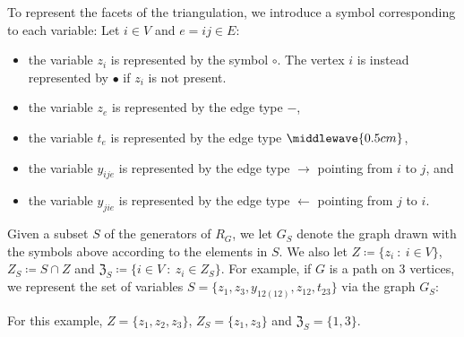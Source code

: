 To represent the facets of the triangulation, we introduce a symbol corresponding to each variable: Let $i\in V$ and $e=ij\in E$:
\begin{itemize}
    \item the variable $z_i$ is represented by the symbol $\circ$.  The vertex $i$ is instead represented by $\bullet$ if $z_i$ is not present. 
    \item the variable $z_{e}$ is represented by the edge type $-$,
    \item the variable $t_{e}$ is represented by the edge type $\middlewave{0.5cm}$,
    \item the variable $y_{ije}$ is represented by the edge type $\rightarrow$ pointing from $i$ to $j$, and 
    \item the variable $y_{jie}$ is represented by the edge type $\leftarrow$ pointing from $j$ to $i$. 
\end{itemize}
Given a subset $S$ of the generators of $R_{G}$, we let $G_S$ denote the graph drawn with the symbols above according to the elements in $S$.  
We also let $Z \coloneqq \{z_i~ :~ i\in V\}$, $Z_S \coloneqq S\cap Z$ and $\mathfrak{Z}_S \coloneqq \{ i \in V~ : ~z_i \in Z_S\}$.
For example, if $G$ is a path on $3$ vertices, we represent the set of variables $S = \{z_1, z_3, y_{12(12)}, z_{12}, t_{23}\}$ via the graph $G_S$:
\begin{center}
\end{center}
For this example, $Z = \{z_1,z_2,z_3\}$, $Z_S = \{z_1, z_3\}$ and $\mathfrak{Z}_S = \{1,3\}$. 

